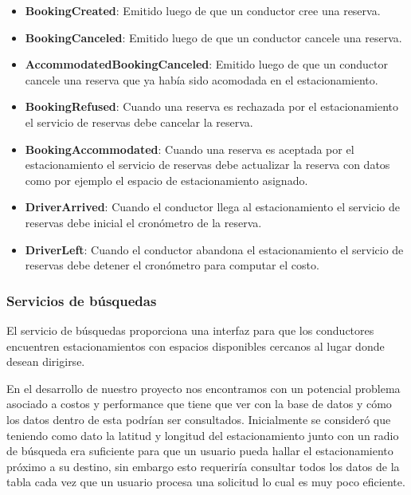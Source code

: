 \begin{itemize}
    \item \textbf{BookingCreated}: Emitido luego de que un conductor cree una reserva.
    \item \textbf{BookingCanceled}: Emitido luego de que un conductor cancele una reserva.
    \item \textbf{AccommodatedBookingCanceled}: Emitido luego de que un conductor cancele una reserva que ya había sido acomodada en el estacionamiento.
\end{itemize}

\begin{itemize}
    \item \textbf{BookingRefused}: Cuando una reserva es rechazada por el estacionamiento el servicio de reservas debe cancelar la reserva.
    \item \textbf{BookingAccommodated}: Cuando una reserva es aceptada por el estacionamiento el servicio de reservas debe actualizar la reserva con datos como por ejemplo el espacio de estacionamiento asignado.
    \item \textbf{DriverArrived}: Cuando el conductor llega al estacionamiento el servicio de reservas debe inicial el cronómetro de la reserva.
    \item \textbf{DriverLeft}: Cuando el conductor abandona el estacionamiento el servicio de reservas debe detener el cronómetro para computar el costo.
\end{itemize}



\subsubsection{Servicios de búsquedas}
El servicio de búsquedas proporciona una interfaz para que los conductores encuentren estacionamientos con espacios disponibles cercanos al lugar donde desean dirigirse.

En el desarrollo de nuestro proyecto nos encontramos con un potencial problema asociado a costos y performance que tiene que ver con la base de datos y cómo los datos dentro de esta podrían ser consultados. Inicialmente se consideró que teniendo como dato la latitud y longitud del estacionamiento junto con un radio de búsqueda era suficiente para que un usuario pueda hallar el estacionamiento próximo a su destino, sin embargo esto requeriría consultar todos los datos de la tabla cada vez que un usuario procesa una solicitud lo cual es muy poco eficiente.

